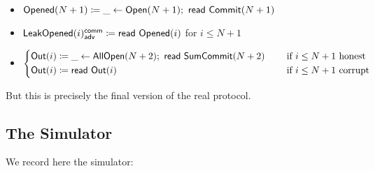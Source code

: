 \begin{itemize}
\item {\color{red} $\mathsf{Opened}(N+1) \coloneqq \_ \leftarrow \mathsf{Open}(N+1); \ \mathsf{read} \ \mathsf{Commit}(N+1)$}
\item {\color{red} $\mathsf{LeakOpened}(i)^{\mathsf{comm}}_{\mathsf{adv}} \coloneqq \mathsf{read} \ \mathsf{Opened}(i)$ for $i \leq N+1$}
\item $\begin{cases*} \Out(i) \coloneqq \_ \leftarrow \AllOpen(N+2); \ \read{\SumCommit(N+2)} & \hspace{10pt} \text{if $i \leq N+1$ honest} \\ \Out(i) \coloneqq \read{\Out(i)} & \hspace{10pt} \text{if $i \leq N+1$ corrupt} \end{cases*}$
\end{itemize}

\noindent But this is precisely the final version of the real protocol.

\subsection{The Simulator}
We record here the simulator:

